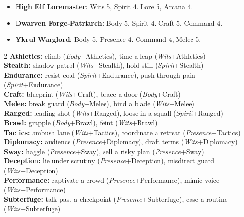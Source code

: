 \begin{tcolorbox}[title=Prestige NPCs (Tier IV--V), colback=white!97!gray,breakable]
\begin{itemize}
  \item \textbf{High Elf Loremaster:} Wits 5, Spirit 4. Lore 5, Arcana 4.
  \item \textbf{Dwarven Forge-Patriarch:} Body 5, Spirit 4. Craft 5, Command 4.
  \item \textbf{Ykrul Warglord:} Body 5, Presence 4. Command 4, Melee 5.
\end{itemize}
\end{tcolorbox}

\begin{tcolorbox}[title=Common Rolls (GM Screen Reference), colback=white!97!gray, colframe=black!80!gray,breakable]
\begin{multicols}{2}
\textbf{Athletics:} climb (\emph{Body}+Athletics), time a leap (\emph{Wits}+Athletics)\\
\textbf{Stealth:} shadow patrol (\emph{Wits}+Stealth), hold still (\emph{Spirit}+Stealth)\\
\textbf{Endurance:} resist cold (\emph{Spirit}+Endurance), push through pain (\emph{Spirit}+Endurance)\\
\textbf{Craft:} blueprint (\emph{Wits}+Craft), brace a door (\emph{Body}+Craft)\\
\textbf{Melee:} break guard (\emph{Body}+Melee), bind a blade (\emph{Wits}+Melee)\\
\textbf{Ranged:} leading shot (\emph{Wits}+Ranged), loose in a squall (\emph{Spirit}+Ranged)\\
\textbf{Brawl:} grapple (\emph{Body}+Brawl), feint (\emph{Wits}+Brawl)\\
\textbf{Tactics:} ambush lane (\emph{Wits}+Tactics), coordinate a retreat (\emph{Presence}+Tactics)\\
\textbf{Diplomacy:} audience (\emph{Presence}+Diplomacy), draft terms (\emph{Wits}+Diplomacy)\\
\textbf{Sway:} haggle (\emph{Presence}+Sway), sell a risky plan (\emph{Presence}+Sway)\\
\textbf{Deception:} lie under scrutiny (\emph{Presence}+Deception), misdirect guard (\emph{Wits}+Deception)\\
\textbf{Performance:} captivate a crowd (\emph{Presence}+Performance), mimic voice (\emph{Wits}+Performance)\\
\textbf{Subterfuge:} talk past a checkpoint (\emph{Presence}+Subterfuge), case a routine (\emph{Wits}+Subterfuge)\\

\end{multicols}
\end{tcolorbox}
